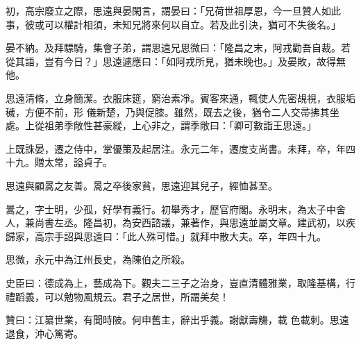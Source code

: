 \begin{pinyinscope}
 初，高宗廢立之際，思遠與晏閑言，謂晏曰：「兄荷世祖厚恩，今一旦贊人如此事，彼或可以權計相須，未知兄將來何以自立。若及此引決，猶可不失後名。」



 晏不納。及拜驃騎，集會子弟，謂思遠兄思微曰：「隆昌之末，阿戎勸吾自裁。若從其語，豈有今日？」思遠遽應曰：「如阿戎所見，猶未晚也。」及晏敗，故得無他。



 思遠清脩，立身簡潔。衣服床筵，窮治素凈。賓客來通，輒使人先密覘視，衣服垢穢，方便不前，形
 儀新楚，乃與促膝。雖然，既去之後，猶令二人交帚拂其坐處。上從祖弟季敞性甚豪縱，上心非之，謂季敞曰：「卿可數詣王思遠。」



 上既誅晏，遷之侍中，掌優策及起居注。永元二年，遷度支尚書。未拜，卒，年四十九。贈太常，謚貞子。



 思遠與顧暠之友善。暠之卒後家貧，思遠迎其兒子，經恤甚至。



 暠之，字士明，少孤，好學有義行。初舉秀才，歷官府閣。永明末，為太子中舍人，兼尚書左丞。隆昌初，為安西諮議，兼著作，與思遠並屬文章。建武初，以疾歸家，高宗手詔與思遠曰：「此人殊可惜。」就拜中散大夫。卒，年四十九。



 思微，永元中為江州長史，為陳伯之所殺。



 史臣曰：德成為上，藝成為下。觀夫二三子之治身，豈直清體雅業，取隆基構，行禮蹈義，可以勉物風規云。君子之居世，所謂美矣！



 贊曰：江纂世業，有聞時陂。何申舊主，辭出乎義。謝獻壽觴，載
 色載刺。思遠退食，沖心篤寄。



\end{pinyinscope}